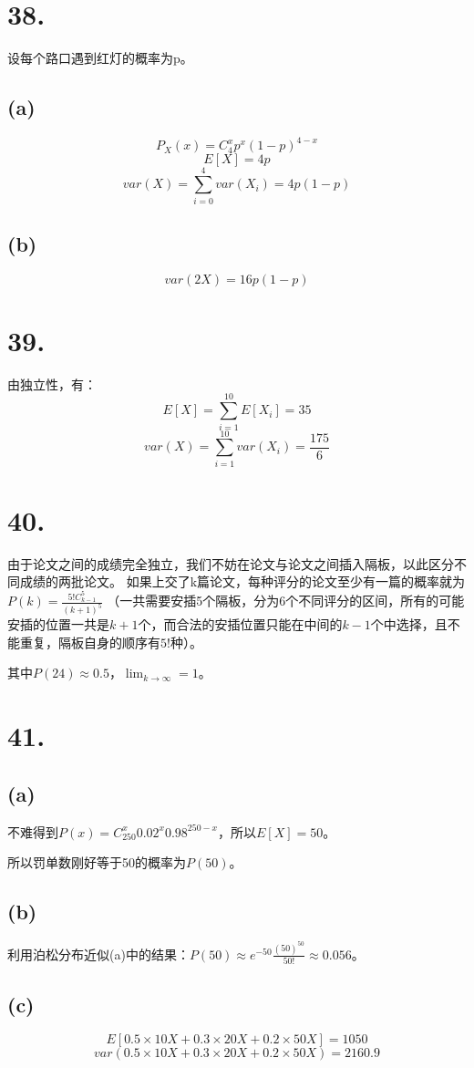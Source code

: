 \documentclass[UTF8]{report}
\begin{document}
    \section*{38.}
        设每个路口遇到红灯的概率为p。
        \subsection*{(a)}
            $$P_X(x) = C_4^xp^x(1 - p)^{4 - x}$$
            $$E[X] = 4p$$
            $$var(X) = \sum_{i = 0}^4var(X_i) = 4p(1 - p)$$
        \subsection*{(b)}
            $$var(2X) = 16p(1 - p)$$
    \section*{39.}
        由独立性，有：
        $$E[X] = \sum_{i = 1}^{10}E[X_i] = 35$$
        $$var(X) = \sum_{i = 1}^{10}var(X_i) = \frac{175}{6}$$
    \section*{40.}
        由于论文之间的成绩完全独立，我们不妨在论文与论文之间插入隔板，以此区分不同成绩的两批论文。
        如果上交了k篇论文，每种评分的论文至少有一篇的概率就为$P(k) = \frac{5!C_{k - 1}^5}{(k + 1)^5}$
        （一共需要安插5个隔板，分为6个不同评分的区间，所有的可能安插的位置一共是$k + 1$个，而合法的安插位置只能在中间的$k - 1$个中选择，且不能重复，隔板自身的顺序有$5!$种）。

        其中$P(24) \approx 0.5$，$\lim_{k \to \infty} = 1$。
    \section*{41.}
        \subsection*{(a)}
            不难得到$P(x) = C_{250}^x0.02^x0.98^{250 - x}$，所以$E[X] = 50$。

            所以罚单数刚好等于50的概率为$P(50)$。
        \subsection*{(b)}
            利用泊松分布近似(a)中的结果：$P(50) \approx e^{-50}\frac{(50)^{50}}{50!} \approx 0.056$。
        \subsection*{(c)}
            $$E[0.5 \times 10X + 0.3 \times 20X + 0.2 \times 50X] = 1050$$
            $$var(0.5 \times 10X + 0.3 \times 20X + 0.2 \times 50X) = 2160.9$$
\end{document}
